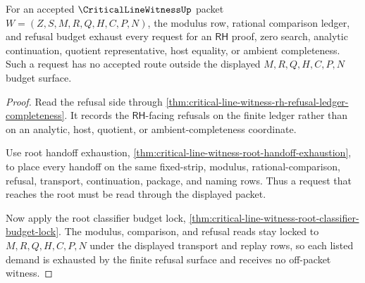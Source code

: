 \begin{theorem}
\label{thm:critical-line-witness-modulus-budget-rh-refusal-exhaustion}
For an accepted $\CriticalLineWitnessUp$ packet $W=(Z,S,M,R,Q,H,C,P,N)$, the
modulus row, rational comparison ledger, and refusal budget exhaust every
request for an $\mathsf{RH}$ proof, zero search, analytic continuation,
quotient representative, host equality, or ambient completeness. Such a
request has no accepted route outside the displayed $M,R,Q,H,C,P,N$ budget
surface.
\end{theorem}
\begin{proof}
Read the refusal side through
\autoref{thm:critical-line-witness-rh-refusal-ledger-completeness}. It records
the $\mathsf{RH}$-facing refusals on the finite ledger rather than on an
analytic, host, quotient, or ambient-completeness coordinate.

Use root handoff exhaustion,
\autoref{thm:critical-line-witness-root-handoff-exhaustion}, to place every
handoff on the same fixed-strip, modulus, rational-comparison, refusal,
transport, continuation, package, and naming rows. Thus a request that reaches
the root must be read through the displayed packet.

Now apply the root classifier budget lock,
\autoref{thm:critical-line-witness-root-classifier-budget-lock}. The modulus,
comparison, and refusal reads stay locked to $M,R,Q,H,C,P,N$ under the
displayed transport and replay rows, so each listed demand is exhausted by the
finite refusal surface and receives no off-packet witness.
\end{proof}

